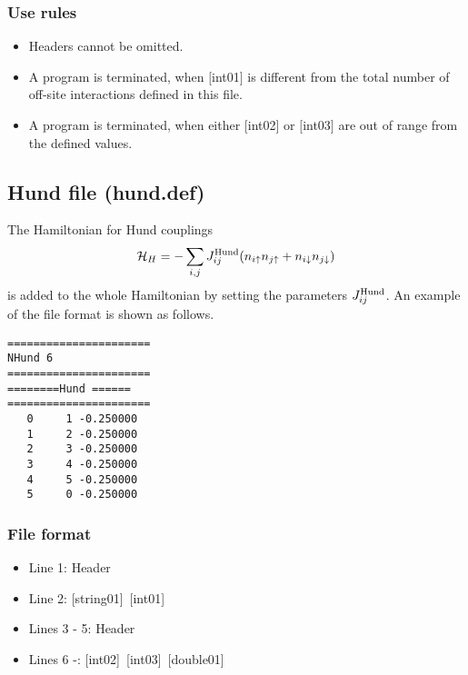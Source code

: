 \subsubsection{Use rules}
\begin{itemize}
\item Headers cannot be omitted. 
\item A program is terminated, when $[$int01$]$ is different from the total number of off-site interactions defined in this file.
\item A program is terminated, when either $[$int02$]$ or $[$int03$]$ are out of range from the defined values.
\end{itemize}

\newpage
\subsection{Hund file (hund.def)}
The Hamiltonian for Hund couplings
\begin{equation}
{\cal H}_H =-\sum_{i,j}J_{ij}^{\rm Hund} (n_{i\uparrow}n_{j\uparrow}+n_{i\downarrow}n_{j\downarrow})
\end{equation}
is added to the whole Hamiltonian by setting the parameters $J_{ij}^{\rm Hund}$. 
An example of the file format is shown as follows.

\begin{minipage}{12.5cm}
\begin{screen}
\begin{verbatim}
====================== 
NHund 6  
====================== 
========Hund ====== 
====================== 
   0     1 -0.250000
   1     2 -0.250000
   2     3 -0.250000
   3     4 -0.250000
   4     5 -0.250000
   5     0 -0.250000
\end{verbatim}
\end{screen}
\end{minipage}

\subsubsection{File format}
 \begin{itemize}
   \item  Line 1:  Header
   \item  Line 2:   [string01]~[int01]
   \item  Lines 3 - 5:  Header
   \item  Lines 6 -: 
   [int02]~[int03]~[double01] 
  \end{itemize}

